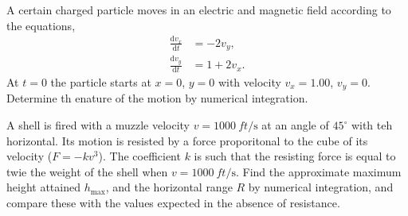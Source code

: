 \documentclass[../feynman-lectures-on-physics.tex]{subfiles}
\begin{document}
\begin{questions}

\question A certain charged particle moves in an electric and magnetic field
according to the equations,
\begin{align*}
  \frac{\mathrm{d}v_x}{\mathrm{d}t} &= -2v_y, \\
  \frac{\mathrm{d}v_y}{\mathrm{d}t} &= 1 + 2v_x.
\end{align*}
At $t=0$ the particle starts at $x=0$, $y=0$ with velocity $v_x=1.00$, $v_y=0$.
Determine th enature of the motion by numerical integration.

\question A shell is fired with a muzzle velocity $v = \SI{1000}{ft\per\second}$
at an angle of $45^\circ$ with teh horizontal. Its motion is resisted by a force
proporitonal to the cube of its velocity ($F = -kv^3$). The coefficient $k$ is
such that the resisting force is equal to twie the weight of the shell when $v =
\SI{1000}{ft\per\second}$. Find the approximate maximum height attained
$h_{\text{max}}$, and the horizontal range $R$ by numerical integration, and
compare these with the values expected in the absence of resistance.

\end{questions}
\end{document}
